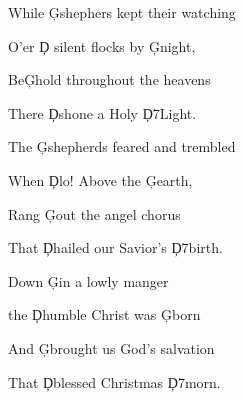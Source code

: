 \documentclass[9pt]{extarticle}
\begin{document}
\bsong

\bc
{}

\ec

\bv
While \c{G}shephers kept their watching

O'er \c{D} silent flocks by \c{G}night,

Be\c{G}hold throughout the heavens

There \c{D}shone a Holy \c{D7}Light.
\ev


\bv
The \c{G}shepherds feared and trembled

When \c{D}lo! Above the \c{G}earth,

Rang \c{G}out the angel chorus

That \c{D}hailed our Savior's \c{D7}birth.
\ev


\bv
Down \c{G}in a lowly manger

the \c{D}humble Christ was \c{G}born

And \c{G}brought us God's salvation

That \c{D}blessed Christmas \c{D7}morn.
\ev


\esong
\end{document}
